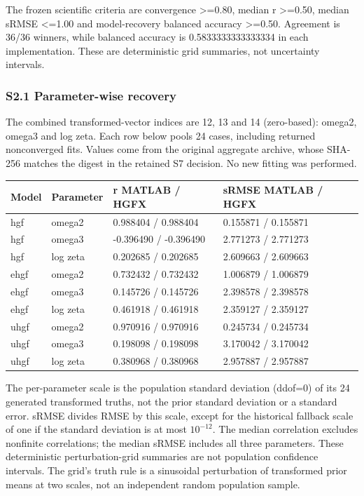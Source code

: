\documentclass[
  11pt,
]{article}
\newcounter{none} %
\begin{document}
The frozen scientific criteria are convergence \textgreater=0.80, median
r \textgreater=0.50, median sRMSE \textless=1.00 and model-recovery
balanced accuracy \textgreater=0.50. Agreement is 36/36 winners, while
balanced accuracy is 0.5833333333333334 in each implementation. These
are deterministic grid summaries, not uncertainty intervals.

\subsubsection{S2.1 Parameter-wise
recovery}\label{s2.1-parameter-wise-recovery}

The combined transformed-vector indices are 12, 13 and 14 (zero-based):
omega2, omega3 and log zeta. Each row below pools 24 cases, including
returned nonconverged fits. Values come from the original aggregate
archive, whose SHA-256 matches the digest in the retained S7 decision.
No new fitting was performed.

{\def\LTcaptype{none} %
\begin{minipage}{\linewidth}
\begin{tabular}{@{}llll@{}}
\toprule\noalign{}
Model & Parameter & r MATLAB / HGFX & sRMSE MATLAB / HGFX \\
\midrule\noalign{}


hgf & omega2 & 0.988404 / 0.988404 & 0.155871 / 0.155871 \\
hgf & omega3 & -0.396490 / -0.396490 & 2.771273 / 2.771273 \\
hgf & log zeta & 0.202685 / 0.202685 & 2.609663 / 2.609663 \\
ehgf & omega2 & 0.732432 / 0.732432 & 1.006879 / 1.006879 \\
ehgf & omega3 & 0.145726 / 0.145726 & 2.398578 / 2.398578 \\
ehgf & log zeta & 0.461918 / 0.461918 & 2.359127 / 2.359127 \\
uhgf & omega2 & 0.970916 / 0.970916 & 0.245734 / 0.245734 \\
uhgf & omega3 & 0.198098 / 0.198098 & 3.170042 / 3.170042 \\
uhgf & log zeta & 0.380968 / 0.380968 & 2.957887 / 2.957887 \\
\bottomrule
\end{tabular}
\end{minipage}

}

The per-parameter scale is the population standard deviation (ddof=0) of
its 24 generated transformed truths, not the prior standard deviation or
a standard error. sRMSE divides RMSE by this scale, except for the
historical fallback scale of one if the standard deviation is at most
\(10^{-12}\). The median correlation excludes nonfinite correlations;
the median sRMSE includes all three parameters. These deterministic
perturbation-grid summaries are not population confidence intervals. The
grid's truth rule is a sinusoidal perturbation of transformed prior
means at two scales, not an independent random population sample.
\end{document}
